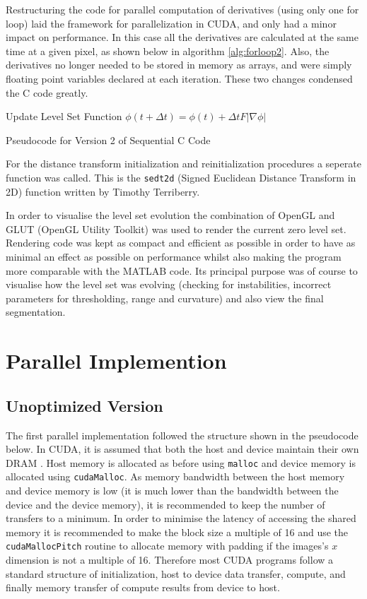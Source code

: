 Restructuring the code for parallel computation of derivatives (using only one for loop) laid the framework for parallelization in CUDA, and only had a minor impact on performance. In this case all the derivatives are calculated at the same time at a given pixel, as shown below in algorithm \ref{alg:forloop2}. Also, the derivatives no longer needed to be stored in memory as arrays, and were simply floating point variables declared at each iteration. These two changes condensed the C code greatly.


\begin{algorithm}[h]
\BlankLine
\dontprintsemicolon
{}
\BlankLine
Update Level Set Function $\phi(t+\Delta t) =\phi(t) + \Delta t F|\nabla\phi|$\;
\caption{Pseudocode for Version 2 of Sequential C Code}\label{alg:forloop2}
\end{algorithm}

For the distance transform initialization and reinitialization procedures a seperate function was called. This is the \texttt{sedt2d} (Signed Euclidean Distance Transform in 2D) function written by Timothy Terriberry.

In order to visualise the level set evolution the combination of OpenGL and GLUT (OpenGL Utility Toolkit) was used to render the current zero level set. Rendering code was kept as compact and efficient as possible in order to have as minimal an effect as possible on performance whilst also making the program more comparable with the MATLAB code. Its principal purpose was of course to visualise how the level set was evolving (checking for instabilities, incorrect parameters for thresholding, range and curvature) and also view the final segmentation. 

\section{Parallel Implemention}\label{parallel}
	\subsection{Unoptimized Version}
The first parallel implementation followed the structure shown in the pseudocode below. In CUDA, it is assumed that both the host and device maintain their own DRAM \cite{cuda}. Host memory is allocated as before using \texttt{malloc} and device memory is allocated using \texttt{cudaMalloc}. As memory bandwidth between the host memory and device memory is low (it is much lower than the bandwidth between the device and the device memory), it is recommended to keep the number of transfers to a minimum. In order to minimise the latency of accessing the shared memory it is recommended to make the block size a multiple of 16 and use the \texttt{cudaMallocPitch} routine to allocate memory with padding if the images's $x$ dimension is not a multiple of 16. Therefore most CUDA programs follow a standard structure of initialization, host to device data transfer, compute, and finally memory transfer of compute results from device to host. 

